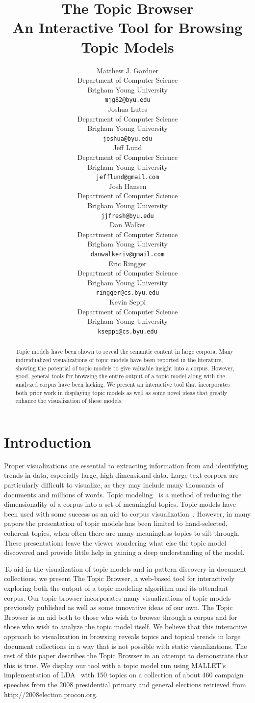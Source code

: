 \documentclass{article}
\title{The Topic Browser\\An Interactive Tool for Browsing Topic Models}
\author{
Matthew J. Gardner \\
Department of Computer Science \\
Brigham Young University \\
\texttt{mjg82@byu.edu} \\
\And
Joshua Lutes \\
Department of Computer Science \\
Brigham Young University \\
\texttt{joshua@byu.edu} \\
\And
Jeff Lund \\
Department of Computer Science \\
Brigham Young University \\
\texttt{jefflund@gmail.com} \\
\And
Josh Hansen \\
Department of Computer Science \\
Brigham Young University \\
\texttt{jjfresh@byu.edu} \\
\And
Dan Walker \\
Department of Computer Science \\
Brigham Young University \\
\texttt{danwalkeriv@gmail.com} \\
\And
Eric Ringger \\
Department of Computer Science \\
Brigham Young University \\
\texttt{ringger@cs.byu.edu} \\
\And
Kevin Seppi \\
Department of Computer Science \\
Brigham Young University \\
\texttt{kseppi@cs.byu.edu} \\
}
\begin{document}
\nipsfinalcopy %
\maketitle

\begin{abstract}

Topic models have been shown to reveal the semantic content in large corpora.
Many individualized visualizations of topic models have been reported in the
literature, showing the potential of topic models to give valuable insight into
a corpus.  However, good, general tools for browsing the entire output of a
topic model along with the analyzed corpus have been lacking.  We present an
interactive tool that incorporates both prior work in displaying topic models
as well as some novel ideas that greatly enhance the visualization of these
models.

\end{abstract}

\section{Introduction}

Proper visualizations are essential to extracting information from and
identifying trends in data, especially large, high dimensional data.  Large
text corpora are particularly difficult to visualize, as they may include many
thousands of documents and millions of words.  Topic
modeling~\cite{blei-2003-latent-dirichlet-allocation} is a method of reducing
the dimensionality of a corpus into a set of meaningful topics.  Topic models
have been used with some success as an aid to corpus
visualization~\cite{blei-2009-topic-models,
newman-2010-visualizing-with-topic-maps}.  However, in many papers the
presentation of topic models has been limited to hand-selected, coherent
topics, when often there are many meaningless topics to sift through.  These
presentations leave the viewer wondering what else the topic model discovered
and provide little help in gaining a deep understanding of the model.

To aid in the visualization of topic models and in pattern discovery in
document collections, we present The Topic Browser, a web-based tool for
interactively exploring both the output of a topic modeling algorithm and its
attendant corpus.  Our topic browser incorporates many visualizations of topic
models previously published as well as some innovative ideas of our own.  The
Topic Browser is an aid both to those who wish to browse through a corpus and
for those who wish to analyze the topic model itself.  We believe that this
interactive approach to visualization in browsing reveals topics and topical
trends in large document collections in a way that is not possible with static
visualizations.  The rest of this paper describes the Topic Browser in an
attempt to demonstrate that this is true.  We display our tool with a topic
model run using MALLET's implementation of LDA~\cite{mallet} with 150 topics on
a collection of about 460 campaign speeches from the 2008 presidential primary
and general elections retrieved from http://2008election.procon.org.
\end{document}
